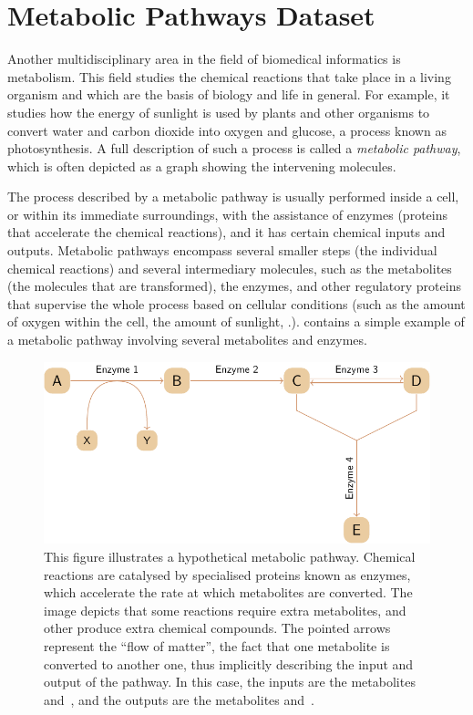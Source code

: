 \section{Metabolic Pathways Dataset} \label{sec:data/pathways}

Another multidisciplinary area in the field of biomedical informatics is metabolism. This field studies the chemical reactions that take place in a living organism and which are the basis of biology and life in general. For example, it studies how the energy of sunlight is used by plants and other organisms to convert water and carbon dioxide into oxygen and glucose, a process known as photosynthesis. A full description of such a process is called a \emph{metabolic pathway}, which is often depicted as a graph showing the intervening molecules.

The process described by a metabolic pathway is usually performed inside a cell, or within its immediate surroundings, with the assistance of enzymes (proteins that accelerate the chemical reactions), and it has certain chemical inputs and outputs. Metabolic pathways encompass several smaller steps (the individual chemical reactions) and several intermediary molecules, such as the metabolites (the molecules that are transformed), the enzymes, and other regulatory proteins that supervise the whole process based on cellular conditions (such as the amount of oxygen within the cell, the amount of sunlight, \etc.).  contains a simple example of a metabolic pathway involving several metabolites and enzymes.

\begin{figure}
    \centering
    \includegraphics{images/pathway.pdf}
    \caption[Example metabolic pathway]{This figure illustrates a hypothetical metabolic pathway. Chemical reactions are catalysed by specialised proteins known as enzymes, which accelerate the rate at which metabolites are converted. The image depicts that some reactions require extra metabolites, and other produce extra chemical compounds. The pointed arrows represent the ``flow of matter'', \ie the fact that one metabolite is converted to another one, thus implicitly describing the input and output of the pathway. In this case, the inputs are the metabolites  and~, and the outputs are the metabolites  and~.}
    \label{fig:pathway}
\end{figure}

